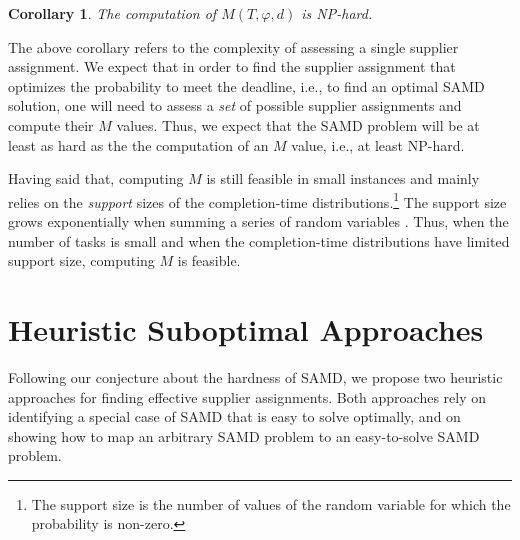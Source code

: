 \documentclass[letterpaper]{article} %
\newtheorem{corollary}{Corollary}
\newcommand{\samd}{\ac{SAMD}\xspace}
\newcommand\Tal[1]{\nb{\textbf{Tal:}}{green}{#1}}
\newcommand\Roni[1]{\nb{\textbf{Roni:}}{blue}{#1}}
\begin{document}


\begin{corollary}
The computation of $M(T, \varphi, d)$ is NP-hard.
\label{cor:m}
\end{corollary}
The above corollary refers to the complexity of assessing a single supplier assignment. We expect that in order to find the supplier assignment that optimizes the probability to meet the deadline, i.e., to find an optimal \samd solution, one will need to assess a \emph{set} of possible supplier assignments and compute their $M$ values. Thus, we expect that the \samd problem will be at least as hard as the the computation of an $M$ value, i.e., at least NP-hard.



Having said that, computing $M$ is still feasible in small instances and mainly relies on the \emph{support} sizes of the completion-time distributions.\footnote{The support size is the number of values of the random variable for which the probability is non-zero.} The support size grows exponentially when summing a series of random variables \cite{cohen2015estimating}. Thus, when the number of tasks is small and when the completion-time distributions have limited support size, computing $M$ is feasible.

\section{Heuristic Suboptimal Approaches}

Following our conjecture about the hardness of \samd, we propose two heuristic approaches for finding effective supplier assignments. Both approaches rely on identifying a special case of \samd that is easy to solve optimally, and on showing how to map an arbitrary \samd problem to an easy-to-solve \samd problem.
\end{document}
